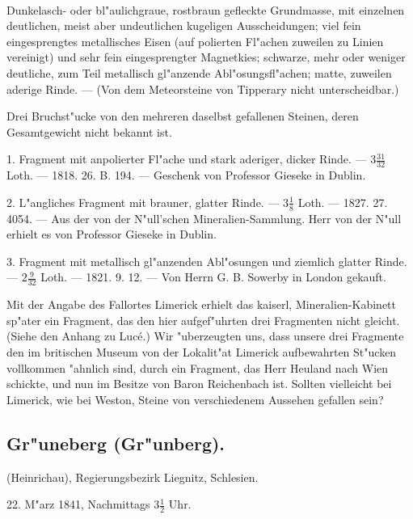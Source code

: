 \documentclass[a4paper, 11pt, oneside, polutonikogreek, german]{article}
\begin{document}
\paragraph{}
Dunkelasch- oder bl"aulichgraue, rostbraun gefleckte Grundmasse, mit einzelnen deutlichen, meist aber undeutlichen kugeligen Ausscheidungen; viel fein eingesprengtes metallisches Eisen (auf polierten Fl"achen zuweilen zu Linien vereinigt) und sehr fein eingesprengter Magnetkies; schwarze, mehr oder weniger deutliche, zum Teil metallisch gl"anzende Abl"osungsfl"achen; matte, zuweilen aderige Rinde. --- (Von dem Meteorsteine von Tipperary nicht unterscheidbar.)

Drei Bruchst"ucke von den mehreren daselbst gefallenen Steinen, deren Gesamtgewicht nicht bekannt ist.

1. Fragment mit anpolierter Fl"ache und stark aderiger, dicker Rinde. --- $3\frac{31}{32}$ Loth. --- 1818. 26. B. 194. --- Geschenk von Professor Gieseke in Dublin.

2. L"angliches Fragment mit brauner, glatter Rinde. --- $3\frac{1}{8}$ Loth. --- 1827. 27. 4054. --- Aus der von der N"ull'schen Mineralien-Sammlung. Herr von der N"ull erhielt es von Professor Gieseke in Dublin.

3. Fragment mit metallisch gl"anzenden Abl"osungen und ziemlich glatter Rinde. --- $2\frac{9}{32}$ Loth. --- 1821. 9. 12. --- Von Herrn G. B. Sowerby in London gekauft.

\setlength{\leftskip}{10mm}
\setlength{\parindent}{0pt}

{\footnotesize Mit der Angabe des Fallortes Limerick erhielt das kaiserl, Mineralien-Kabinett sp"ater ein Fragment, das den hier aufgef"uhrten drei Fragmenten nicht gleicht. (Siehe den Anhang zu Lucé.) Wir "uberzeugten uns, dass unsere drei Fragmente den im britischen Museum von der Lokalit"at Limerick aufbewahrten St"ucken vollkommen "ahnlich sind, durch ein Fragment, das Herr Heuland nach Wien schickte, und nun im Besitze von Baron Reichenbach ist. Sollten vielleicht bei Limerick, wie bei Weston, Steine von verschiedenem Aussehen gefallen sein?}

\setlength{\leftskip}{0pt}
\setlength{\parindent}{20pt}

\subsection{Gr"uneberg (Gr"unberg).}
\begin{center}
\small
(Heinrichau), Regierungsbezirk Liegnitz, Schlesien.

22. M"arz 1841, Nachmittags $3\frac{1}{2}$ Uhr.
\end{center}
\end{document}
